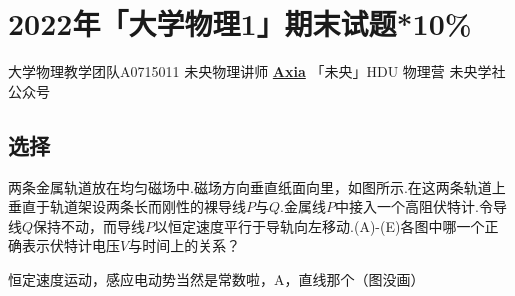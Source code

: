\chapter{2022年「大学物理1」\hdu 期末试题*10\%}
\date{2022年6月??日}{大学物理教学团队}{A0715011}
{未央物理讲师 \href{https://qm.qq.com/q/UPbGudx8cK}{\textbf{Axia}}}
{}{「未央」HDU 物理营}
{}{未央学社公众号}
\section{选择}
\begin{exercise}
两条金属轨道放在均匀磁场中.磁场方向垂直纸面向里，如图所示.在这两条轨道上垂直于轨道架设两条长而刚性的裸导线$P$与$Q$.金属线$P$中接入一个高阻伏特计.令导线$Q$保持不动，而导线$P$以恒定速度平行于导轨向左移动.(A)-(E)各图中哪一个正确表示伏特计电压$V$与时间上的关系？
\end{exercise}
\begin{solution}
恒定速度运动，感应电动势当然是常数啦，A，直线那个（图没画）
\end{solution}

